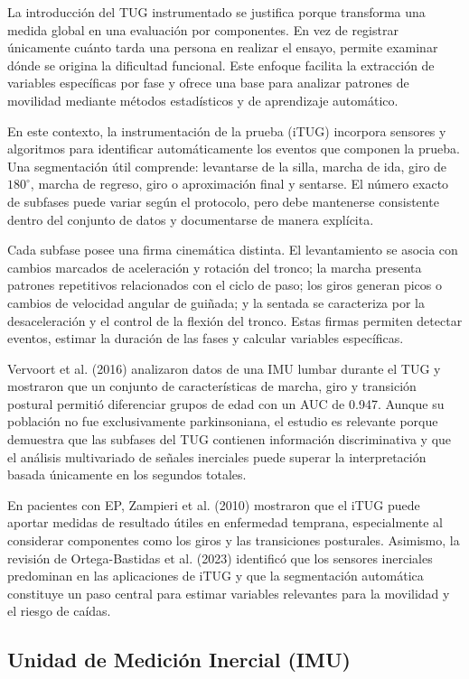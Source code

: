\documentclass[12pt,a4paper]{article}
\begin{document}
La introducción del TUG instrumentado se justifica porque transforma una medida global en una evaluación por componentes. En vez de registrar únicamente cuánto tarda una persona en realizar el ensayo, permite examinar dónde se origina la dificultad funcional. Este enfoque facilita la extracción de variables específicas por fase y ofrece una base para analizar patrones de movilidad mediante métodos estadísticos y de aprendizaje automático.

En este contexto, la instrumentación de la prueba (iTUG) incorpora sensores y algoritmos para identificar automáticamente los eventos que componen la prueba. Una segmentación útil comprende: levantarse de la silla, marcha de ida, giro de $180^\circ$, marcha de regreso, giro o aproximación final y sentarse. El número exacto de subfases puede variar según el protocolo, pero debe mantenerse consistente dentro del conjunto de datos y documentarse de manera explícita.

Cada subfase posee una firma cinemática distinta. El levantamiento se asocia con cambios marcados de aceleración y rotación del tronco; la marcha presenta patrones repetitivos relacionados con el ciclo de paso; los giros generan picos o cambios de velocidad angular de guiñada; y la sentada se caracteriza por la desaceleración y el control de la flexión del tronco. Estas firmas permiten detectar eventos, estimar la duración de las fases y calcular variables específicas.

Vervoort et al. (2016) analizaron datos de una IMU lumbar durante el TUG y mostraron que un conjunto de características de marcha, giro y transición postural permitió diferenciar grupos de edad con un AUC de 0.947. Aunque su población no fue exclusivamente parkinsoniana, el estudio es relevante porque demuestra que las subfases del TUG contienen información discriminativa y que el análisis multivariado de señales inerciales puede superar la interpretación basada únicamente en los segundos totales.

En pacientes con EP, Zampieri et al. (2010) mostraron que el iTUG puede aportar medidas de resultado útiles en enfermedad temprana, especialmente al considerar componentes como los giros y las transiciones posturales. Asimismo, la revisión de Ortega-Bastidas et al. (2023) identificó que los sensores inerciales predominan en las aplicaciones de iTUG y que la segmentación automática constituye un paso central para estimar variables relevantes para la movilidad y el riesgo de caídas.

\subsection{Unidad de Medición Inercial (IMU)}\label{sec:imu}
\end{document}
